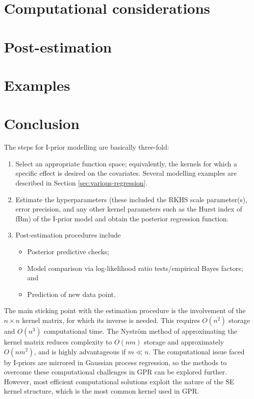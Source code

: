 \documentclass[a4paper,showframe,11pt]{report}
\begin{document}
\section{Computational considerations}\label{sec:ipriorcompcons}


\section{Post-estimation}
%

\section{Examples}\label{sec:ipriorexamples}
%

\section{Conclusion}

The steps for I-prior modelling are basically three-fold:
\begin{enumerate}
  \item Select an appropriate function space; equivalently, the kernels for which a specific effect is desired on the covariates. Several modelling examples are described in Section \ref{sec:various-regression}.
  \item Estimate the hyperparameters (these included the RKHS scale parameter(s), error precision, and any other kernel parameters such as the Hurst index of fBm) of the I-prior model and obtain the posterior regression function.
  \item Post-estimation procedures include
  \begin{itemize}
    \item Posterior predictive checks;
    \item Model comparison via log-likelihood ratio tests/empirical Bayes factors; and
    \item Prediction of new data point.
  \end{itemize}
\end{enumerate}

The main sticking point with the estimation procedure is the involvement of the $n\times n$ kernel matrix, for which its inverse is needed.
This requires $O(n^2)$ storage and $O(n^3)$ computational time.
The Nyström method of approximating the kernel matrix reduces complexity to $O(nm)$ storage and approximately $O(nm^2)$, and is highly advantageous if $m \ll n$.
The computational issue faced by I-priors are mirrored in Gaussian process regression, so the methods to overcome these computational challenges in GPR can be explored further.
However, most efficient computational solutions exploit the nature of the SE kernel structure, which is the most common kernel used in GPR.
\end{document}
